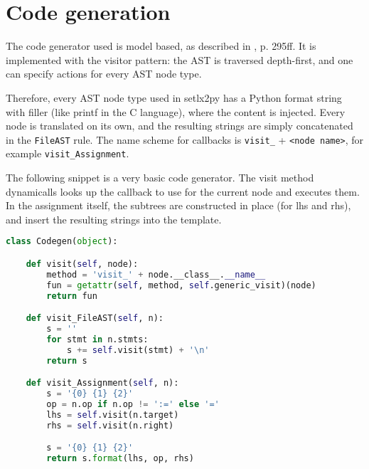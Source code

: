 
\section{Code generation}
\label{sec:codegen}

The code generator used is model based, as described in \cite{parr2010}{, p. 295ff}. It is implemented with the visitor pattern: the AST is traversed depth-first, and one can specify actions for every AST node type. 

Therefore, every AST node type used in setlx2py has a Python format string with filler (like printf in the C language), where the content is injected. Every node is translated on its own, and the resulting strings are simply concatenated in the \texttt{FileAST} rule. The name scheme for callbacks is \texttt{visit\_} + \texttt{<node name>}, for example \texttt{visit\_Assignment}. 

The following snippet is a very basic code generator. The visit method dynamicalls looks up the callback to use for the current node and executes them. In the assignment itself, the subtrees are constructed in place (for lhs and rhs), and insert the resulting strings into the template.

\begin{lstlisting}[language=python]
class Codegen(object):

    def visit(self, node):
        method = 'visit_' + node.__class__.__name__
        fun = getattr(self, method, self.generic_visit)(node)
        return fun

    def visit_FileAST(self, n):
        s = ''
        for stmt in n.stmts:
            s += self.visit(stmt) + '\n'
        return s

    def visit_Assignment(self, n):
        s = '{0} {1} {2}'
        op = n.op if n.op != ':=' else '='
        lhs = self.visit(n.target)
        rhs = self.visit(n.right)

        s = '{0} {1} {2}'
        return s.format(lhs, op, rhs)
\end{lstlisting}

